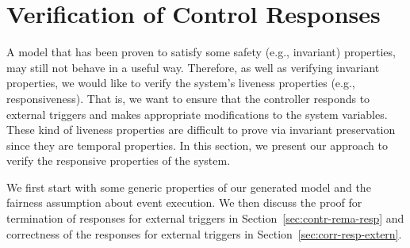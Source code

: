 \section{Verification of Control Responses}
\label{sec:verificationResponses}

A model that has been proven to satisfy some safety (e.g., invariant) properties, 
may still not behave in a useful way.
Therefore, as well as verifying invariant properties, we would like to verify 
the system's liveness properties (e.g., responsiveness). That is, we want to ensure that the controller 
responds to external triggers and makes appropriate modifications to the system variables. 
These kind of liveness properties are difficult to prove via invariant
preservation since they are temporal properties.  In this section, we
present our approach to verify the responsive properties of the system.

We first start with some generic properties of our generated \EventB
model and the fairness assumption about event execution.  We then
discuss the proof for termination of responses for external triggers
in Section~\ref{sec:contr-rema-resp} and correctness of the responses
for external triggers in Section~\ref{sec:corr-resp-extern}.

